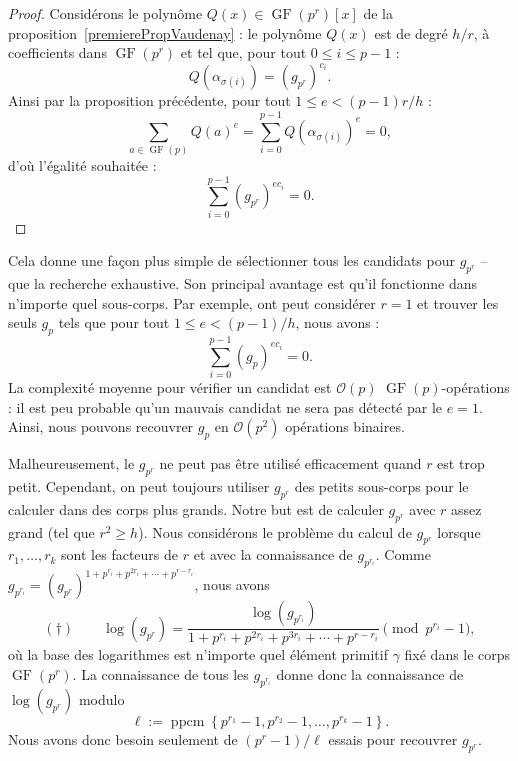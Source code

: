 \documentclass[a4paper, titlepage]{article}
\theoremstyle{definition}
\theoremstyle{remark}
\def\O{\mathcal O}
\def\gf{\operatorname{GF}}
\def\ppcm{\operatorname{ppcm}}
\begin{document}
\begin{proof}
Considérons le polynôme $Q(x)\in\gf(p^r)[x]$ de la proposition~\ref{premierePropVaudenay} : le polynôme $Q(x)$ est de degré $h/r$, à coefficients dans $\gf(p^r)$ et tel que, pour tout $0 \leqslant i \leqslant p-1$ :
$$Q\left(\alpha_{\sigma(i)}\right) = (g_{p^r})^{c_i}.$$
Ainsi par la proposition précédente, pour tout $1 \leqslant e < (p-1)r/h$ :
$$\sum_{a\in\gf(p)} Q(a)^e = \sum_{i=0}^{p-1} Q\left(\alpha_{\sigma(i)}\right)^e = 0,$$
d'où l'égalité souhaitée :
$$\sum_{i=0}^{p-1} (g_{p^r})^{ec_i} = 0.$$
\end{proof}

Cela donne une façon plus simple de sélectionner tous les candidats pour $g_{p^r}$ -- que la recherche exhaustive. Son principal avantage est qu'il fonctionne dans n'importe quel sous-corps. Par exemple, ont peut considérer $r=1$ et trouver les seuls $g_p$ tels que pour tout $1 \leqslant e < (p-1)/h$, nous avons :
$$\sum_{i=0}^{p-1} (g_p)^{ec_i} = 0.$$
La complexité moyenne pour vérifier un candidat est $\O(p)$ $\gf(p)$-opérations : il est peu probable qu'un mauvais candidat ne sera pas détecté par le $e = 1$. Ainsi, nous pouvons recouvrer $g_p$ en $\O(p^2)$ opérations binaires.

Malheureusement, le $g_{p^r}$ ne peut pas être utilisé efficacement quand $r$ est trop petit. Cependant, on peut toujours utiliser $g_{p^r}$ des petits sous-corps pour le calculer dans des corps plus grands. Notre but est de calculer $g_{p^r}$ avec $r$ assez grand (tel que $r^2 \geqslant h$). Nous considérons le problème du calcul de $g_{p^r}$ lorsque $r_1,\dots,r_k$ sont les facteurs de $r$ et avec la connaissance de $g_{p^{r_i}}$. Comme $g_{p^{r_i}} = (g_{p^r})^{1+p^{r_i}+p^{2r_i}+\cdots+p^{r-r_i}}$, nous avons 
$$(\dagger)\qquad\log(g_{p^r}) = \frac{\log(g_{p^{r_i}})}{1+p^{r_i}+p^{2r_i}+p^{3r_i}+\cdots+p^{r-r_i}} \pmod{p^{r_i}-1},$$
où la base des logarithmes est n'importe quel élément primitif $\gamma$ fixé dans le corps $\gf(p^r)$. La connaissance de tous les $g_{p^{r_i}}$ donne donc la connaissance de $\log(g_{p^r})$ modulo
$$\ell := \ppcm \left\{p^{r_1} - 1, p^{r_2}-1, \dots, p^{r_k} -1\right\}.$$
Nous avons donc besoin seulement de $(p^r-1)/\ell$ essais pour recouvrer $g_{p^r}$.
\end{document}
